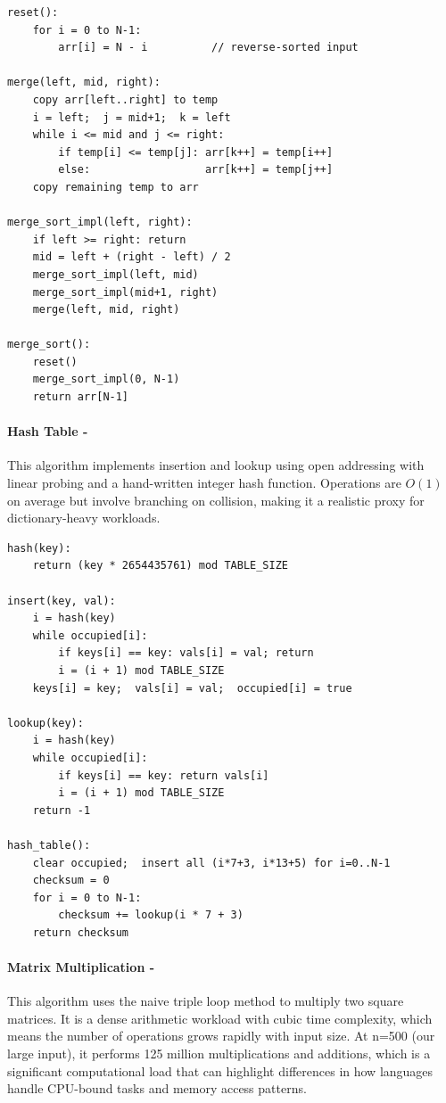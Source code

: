 \begin{lstlisting}[caption={Merge Sort pseudocode}, label={lst:merge_sort}, numbers=none]
reset():
    for i = 0 to N-1:
        arr[i] = N - i          // reverse-sorted input
 
merge(left, mid, right):
    copy arr[left..right] to temp
    i = left;  j = mid+1;  k = left
    while i <= mid and j <= right:
        if temp[i] <= temp[j]: arr[k++] = temp[i++]
        else:                  arr[k++] = temp[j++]
    copy remaining temp to arr
 
merge_sort_impl(left, right):
    if left >= right: return
    mid = left + (right - left) / 2
    merge_sort_impl(left, mid)
    merge_sort_impl(mid+1, right)
    merge(left, mid, right)
 
merge_sort():
    reset()
    merge_sort_impl(0, N-1)
    return arr[N-1]
\end{lstlisting}
 



\paragraph{Hash Table -}
    This algorithm implements insertion and lookup using open addressing with linear probing and a hand-written integer hash function. Operations are $O(1)$ on average but involve branching on collision, making it a realistic proxy for dictionary-heavy workloads.


\begin{lstlisting}[caption={Hash Table pseudocode (open addressing, linear probing)},
                   label={lst:hash_table}, numbers=none]
hash(key):
    return (key * 2654435761) mod TABLE_SIZE
 
insert(key, val):
    i = hash(key)
    while occupied[i]:
        if keys[i] == key: vals[i] = val; return
        i = (i + 1) mod TABLE_SIZE
    keys[i] = key;  vals[i] = val;  occupied[i] = true
 
lookup(key):
    i = hash(key)
    while occupied[i]:
        if keys[i] == key: return vals[i]
        i = (i + 1) mod TABLE_SIZE
    return -1
 
hash_table():
    clear occupied;  insert all (i*7+3, i*13+5) for i=0..N-1
    checksum = 0
    for i = 0 to N-1:
        checksum += lookup(i * 7 + 3)
    return checksum
\end{lstlisting}



\paragraph{Matrix Multiplication -}
    This algorithm uses the naive triple loop method to multiply two square matrices. It is a dense arithmetic workload with cubic time complexity, which means the number of operations grows rapidly with input size. At n=500 (our large input), it performs 125 million multiplications and additions, which is a significant computational load that can highlight differences in how languages handle CPU-bound tasks and memory access patterns.


